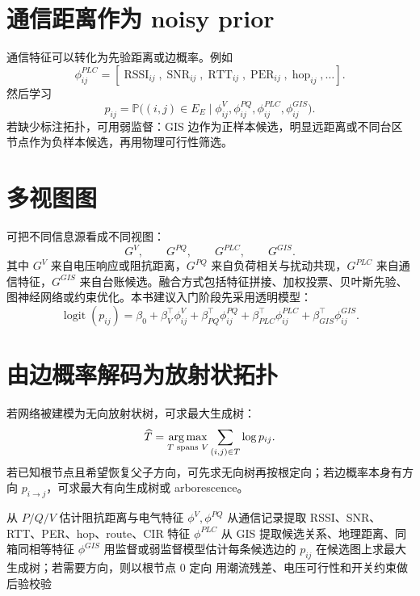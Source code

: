 \section{通信距离作为 noisy prior}

通信特征可以转化为先验距离或边概率。例如
\begin{equation}
  \phi^{PLC}_{ij}=
  [\operatorname{RSSI}_{ij},\operatorname{SNR}_{ij},
  \operatorname{RTT}_{ij},\operatorname{PER}_{ij},
  \operatorname{hop}_{ij},\ldots].
\end{equation}
然后学习
\begin{equation}
  p_{ij}=
  \mathbb{P}\big((i,j)\in E_E
  \mid \phi^{V}_{ij},\phi^{PQ}_{ij},\phi^{PLC}_{ij},\phi^{GIS}_{ij}\big).
  \label{eq:edge_probability_multiview}
\end{equation}
若缺少标注拓扑，可用弱监督：GIS 边作为正样本候选，明显远距离或不同台区节点作为负样本候选，再用物理可行性筛选。

\section{多视图图}

可把不同信息源看成不同视图：
\begin{equation}
  G^V,\qquad G^{PQ},\qquad G^{PLC},\qquad G^{GIS}.
\end{equation}
其中 $G^V$ 来自电压响应或阻抗距离，$G^{PQ}$ 来自负荷相关与扰动共现，$G^{PLC}$ 来自通信特征，$G^{GIS}$ 来自台账候选。融合方式包括特征拼接、加权投票、贝叶斯先验、图神经网络或约束优化。本书建议入门阶段先采用透明模型：
\begin{equation}
  \operatorname{logit}(p_{ij})=
  \beta_0+\beta_V^\top\phi^V_{ij}
  +\beta_{PQ}^\top\phi^{PQ}_{ij}
  +\beta_{PLC}^\top\phi^{PLC}_{ij}
  +\beta_{GIS}^\top\phi^{GIS}_{ij}.
\end{equation}

\section{由边概率解码为放射状拓扑}

若网络被建模为无向放射状树，可求最大生成树：
\begin{equation}
  \widehat T=
  \operatorname*{arg\,max}_{T\text{ spans }V}\sum_{(i,j)\in T}\log p_{ij}.
  \label{eq:maxst_probability}
\end{equation}
若已知根节点且希望恢复父子方向，可先求无向树再按根定向；若边概率本身有方向 $p_{i\to j}$，可求最大有向生成树或 arborescence。

\begin{algorithm}[htbp]
  \caption{多视图拓扑辨识简化流程}
  \label{alg:multiview_pipeline}
  从 $P/Q/V$ 估计阻抗距离与电气特征 $\phi^V,\phi^{PQ}$\;
  从通信记录提取 RSSI、SNR、RTT、PER、hop、route、CIR 特征 $\phi^{PLC}$\;
  从 GIS 提取候选关系、地理距离、同箱同相等特征 $\phi^{GIS}$\;
  用监督或弱监督模型估计每条候选边的 $p_{ij}$\;
  在候选图上求最大生成树；若需要方向，则以根节点 $0$ 定向\;
  用潮流残差、电压可行性和开关约束做后验校验\;
\end{algorithm}

